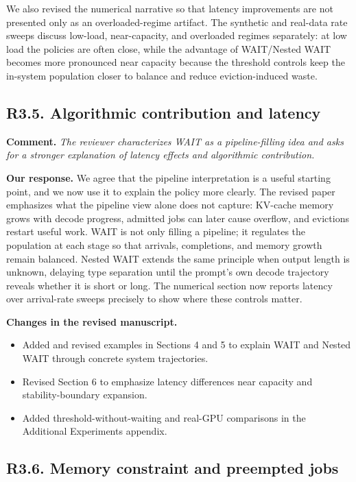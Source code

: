 \documentclass[11pt]{article}
\newcommand{\comment}[1]{%
  \vspace{0.25em}
  \noindent\textbf{Comment.} \emph{#1}
}
\newcommand{\response}{\vspace{0.25em}\noindent\textbf{Our response.} }
\newcommand{\changes}{\vspace{0.25em}\noindent\textbf{Changes in the revised manuscript.} }
\begin{document}
\vspace{0.25em}
\noindent We also revised the numerical narrative so that latency improvements are not presented only as an overloaded-regime artifact. The synthetic and real-data rate sweeps discuss low-load, near-capacity, and overloaded regimes separately: at low load the policies are often close, while the advantage of WAIT/Nested WAIT becomes more pronounced near capacity because the threshold controls keep the in-system population closer to balance and reduce eviction-induced waste.

\subsection*{R3.5. Algorithmic contribution and latency}

\comment{The reviewer characterizes WAIT as a pipeline-filling idea and asks for a stronger explanation of latency effects and algorithmic contribution.}

\response We agree that the pipeline interpretation is a useful starting point, and we now use it to explain the policy more clearly. The revised paper emphasizes what the pipeline view alone does not capture: KV-cache memory grows with decode progress, admitted jobs can later cause overflow, and evictions restart useful work. WAIT is not only filling a pipeline; it regulates the population at each stage so that arrivals, completions, and memory growth remain balanced. Nested WAIT extends the same principle when output length is unknown, delaying type separation until the prompt's own decode trajectory reveals whether it is short or long. The numerical section now reports latency over arrival-rate sweeps precisely to show where these controls matter.

\changes
\begin{itemize}
    \item Added and revised examples in Sections 4 and 5 to explain WAIT and Nested WAIT through concrete system trajectories.
    \item Revised Section 6 to emphasize latency differences near capacity and stability-boundary expansion.
    \item Added threshold-without-waiting and real-GPU comparisons in the Additional Experiments appendix.
\end{itemize}

\subsection*{R3.6. Memory constraint and preempted jobs}
\end{document}
